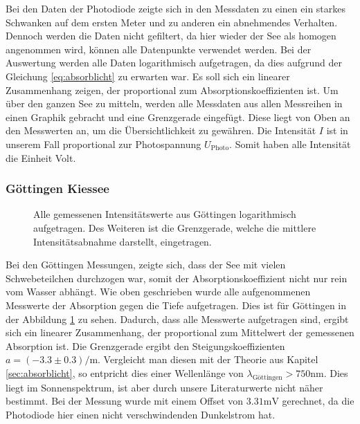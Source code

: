 \documentclass[12pt,a4paper,titlepage,headinclude,bibtotoc]{scrartcl}
\numberwithin{equation}{subsection}
\begin{document}
Bei den Daten der Photodiode zeigte sich in den Messdaten zu einen ein starkes Schwanken auf dem ersten Meter und zu anderen ein abnehmendes Verhalten.
Dennoch werden die Daten nicht gefiltert, da hier wieder der See als homogen angenommen wird, können alle Datenpunkte verwendet werden.
Bei der Auswertung werden alle Daten logarithmisch aufgetragen, da dies aufgrund der Gleichung \ref{eq:absorblicht} zu erwarten war. 
Es soll sich ein linearer Zusammenhang zeigen, der proportional zum Absorptionskoeffizienten ist.
Um über den ganzen See zu mitteln, werden alle Messdaten aus allen Messreihen in einen Graphik gebracht und eine Grenzgerade eingefügt.
Diese liegt von Oben an den Messwerten an, um die Übersichtlichkeit zu gewähren.
Die Intensität $I$ ist in unserem Fall proportional zur Photospannung $U_\text{Photo}$.
Somit haben alle Intensität die Einheit Volt.

\subsubsection{Göttingen Kiessee}
\begin{figure}[!htb]
	\centering
	
	\caption{Alle gemessenen Intensitätswerte aus Göttingen logarithmisch aufgetragen. Des Weiteren ist die Grenzgerade, welche die mittlere Intensitätsabnahme darstellt, eingetragen.}
	\label{fig:lichtGoe}
\end{figure}
Bei den Göttingen Messungen, zeigte sich, dass der See mit vielen Schwebeteilchen durchzogen war, somit der Absorptionskoeffizient nicht nur rein vom Wasser abhängt.
Wie oben geschrieben wurde alle aufgenommenen Messwerte der Absorption gegen die Tiefe aufgetragen.
Dies ist für Göttingen in der Abbildung \ref{fig:lichtGoe} zu sehen.
Dadurch, dass alle Messwerte aufgetragen sind, ergibt sich ein linearer Zusammenhang, der proportional zum Mittelwert der gemessenen Absorption ist.
Die Grenzgerade ergibt den Steigungskoeffizienten $a=(-3.3\pm0.3)\si{\per\meter}$.
Vergleicht man diesen mit der Theorie aus Kapitel \ref{sec:absorblicht}, so entpricht dies einer Wellenlänge von $\lambda_\text{Göttingen}>750\si{\nano\meter}$.
Dies liegt im Sonnenspektrum, ist aber durch unsere Literaturwerte nicht näher bestimmt.
Bei der Messung wurde mit einem Offset von $3.31\si{\milli\volt}$ gerechnet, da die Photodiode hier einen nicht verschwindenden Dunkelstrom hat.
\end{document}
